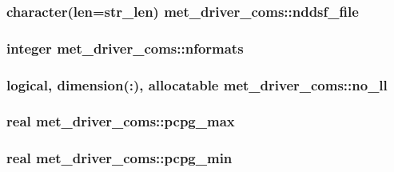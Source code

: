 \subsubsection[{nddsf\+\_\+file}]{\setlength{\rightskip}{0pt plus 5cm}character(len=str\+\_\+len) met\+\_\+driver\+\_\+coms\+::nddsf\+\_\+file}\label{namespacemet__driver__coms_a8adb3cddd748a6ba29fb75dd69ca54c7}
\hypertarget{namespacemet__driver__coms_abe5693ed3bf2168167db941bc9f61eb2}{}
\subsubsection[{nformats}]{\setlength{\rightskip}{0pt plus 5cm}integer met\+\_\+driver\+\_\+coms\+::nformats}\label{namespacemet__driver__coms_abe5693ed3bf2168167db941bc9f61eb2}
\hypertarget{namespacemet__driver__coms_a593e5e00920bf69cc5606914b9af1441}{}
\subsubsection[{no\+\_\+ll}]{\setlength{\rightskip}{0pt plus 5cm}logical, dimension(\+:), allocatable met\+\_\+driver\+\_\+coms\+::no\+\_\+ll}\label{namespacemet__driver__coms_a593e5e00920bf69cc5606914b9af1441}
\hypertarget{namespacemet__driver__coms_adb27c5034caa99a0fcc4d3b42ef1d2e3}{}
\subsubsection[{pcpg\+\_\+max}]{\setlength{\rightskip}{0pt plus 5cm}real met\+\_\+driver\+\_\+coms\+::pcpg\+\_\+max}\label{namespacemet__driver__coms_adb27c5034caa99a0fcc4d3b42ef1d2e3}
\hypertarget{namespacemet__driver__coms_ad1841d1a071652e80742e648d0eed3e8}{}
\subsubsection[{pcpg\+\_\+min}]{\setlength{\rightskip}{0pt plus 5cm}real met\+\_\+driver\+\_\+coms\+::pcpg\+\_\+min}\label{namespacemet__driver__coms_ad1841d1a071652e80742e648d0eed3e8}
\hypertarget{namespacemet__driver__coms_a274fef5f44b832144db4ea49b63fc125}{}
